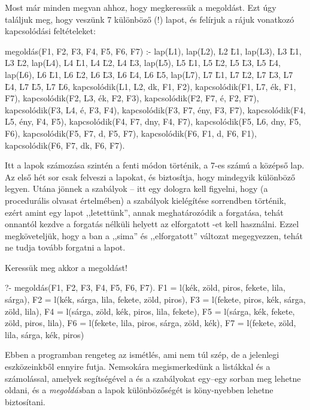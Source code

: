 Most már minden megvan ahhoz, hogy megkeressük a
megoldást. Ezt úgy találjuk meg, hogy veszünk 7
különböző (!) lapot, és felírjuk a rájuk vonatkozó
kapcsolódási feltételeket:
\begin{program}
megoldás(F1, F2, F3, F4, F5, F6, F7) :-
    lap(L1),
    lap(L2), L2 \= L1,
    lap(L3), L3 \= L1, L3 \= L2,
    lap(L4), L4 \= L1, L4 \= L2, L4 \= L3,
    lap(L5), L5 \= L1, L5 \= L2, L5 \= L3, L5 \= L4,
    lap(L6), L6 \= L1, L6 \= L2, L6 \= L3, L6 \= L4,
             L6 \= L5,
    lap(L7), L7 \= L1, L7 \= L2, L7 \= L3, L7 \= L4,
             L7 \= L5, L7 \= L6,
    kapcsolódik(L1, L2, dk,  F1, F2),
    kapcsolódik(F1, L7, ék,  F1, F7),
    kapcsolódik(F2, L3, ék,  F2, F3),
    kapcsolódik(F2, F7, é,   F2, F7),
    kapcsolódik(F3, L4, é,   F3, F4),
    kapcsolódik(F3, F7, ény, F3, F7),
    kapcsolódik(F4, L5, ény, F4, F5),
    kapcsolódik(F4, F7, dny, F4, F7),
    kapcsolódik(F5, L6, dny, F5, F6),
    kapcsolódik(F5, F7, d,   F5, F7),
    kapcsolódik(F6, F1, d,   F6, F1),
    kapcsolódik(F6, F7, dk,  F6, F7).
\end{program}
Itt a lapok számozása szintén a fenti módon
történik, a 7-es számú a középső lap. Az első hét
sor csak felveszi a lapokat, és biztosítja, hogy
mindegyik különböző legyen. Utána jönnek a szabályok
-- itt egy dologra kell figyelni, hogy (a
procedurális olvasat értelmében) a 
szabályok kielégítése sorrendben történik, ezért
amint egy lapot ,,letettünk'', annak meghatározódik
a forgatása, tehát onnantól kezdve a forgatás
nélküli  helyett az elforgatott -et kell
használni. Ezzel megköveteljük, hogy a
ban a ,,sima'' és ,,elforgatott''
változat megegyezzen, tehát ne tudja tovább forgatni
a lapot.

Keressük meg akkor a megoldást!
\begin{query}
?- megoldás(F1, F2, F3, F4, F5, F6, F7).
F1 = l(kék, zöld, piros, fekete, lila, sárga),
F2 = l(kék, sárga, lila, fekete, zöld, piros),
F3 = l(fekete, piros, kék, sárga, zöld, lila),
F4 = l(sárga, zöld, kék, piros, lila, fekete),
F5 = l(sárga, kék, fekete, zöld, piros, lila),
F6 = l(fekete, lila, piros, sárga, zöld, kék),
F7 = l(fekete, zöld, lila, sárga, kék, piros)
\end{query}

Ebben a programban rengeteg az ismétlés, ami nem túl
szép, de a jelenlegi eszközeinkből ennyire
futja. Nemsokára megismerkedünk a listákkal és a
számolással, amelyek segítségével a  és a
 szabályokat egy--egy sorban meg
lehetne oldani, és a \emph{megoldás}ban a lapok
különbözőségét is köny-nyebben lehetne biztosítani.
